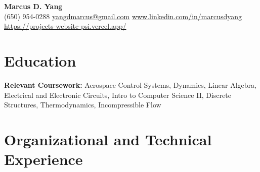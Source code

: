 \newcommand{\entrygap}{\vspace{2pt}}



\begin{center}
  {\fontsize{17}{20}\selectfont\bfseries Marcus D. Yang}\\[2pt]
  {\footnotesize (650) 954-0288 \textbar{} \href{mailto:yangdmarcus@gmail.com}{yangdmarcus@gmail.com} \textbar{} \href{https://www.linkedin.com/in/marcusdyang}{www.linkedin.com/in/marcusdyang} \textbar{} \href{https://projects-website-psi.vercel.app/}{https://projects-website-psi.vercel.app/}}
\end{center}

\section{Education}
\textbf{Relevant Coursework:} Aerospace Control Systems, Dynamics, Linear Algebra, Electrical and Electronic Circuits, Intro to Computer Science II, Discrete Structures, Thermodynamics, Incompressible Flow

\section{Organizational and Technical Experience}


